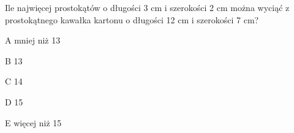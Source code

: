 \begin{tresc}
Ile najwięcej prostokątów o długości 3 cm i szerokości 2 cm można wyciąć z prostokątnego kawałka kartonu o długości 12 cm i szerokości 7 cm?
\end{tresc}
\begin{wariant}{A} mniej niż 13 \end{wariant}
\begin{wariant}{B} 13 \end{wariant}
\begin{wariant}{C} 14 \end{wariant}
\begin{wariant}{D} 15 \end{wariant}
\begin{wariant}{E} więcej niż 15 \end{wariant}
